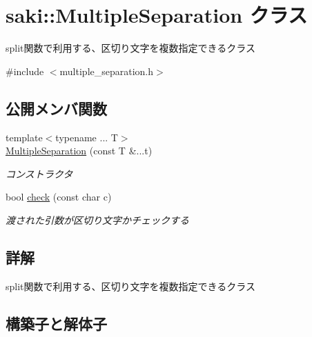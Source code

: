 \hypertarget{classsaki_1_1_multiple_separation}{}\section{saki\+:\+:Multiple\+Separation クラス}
\label{classsaki_1_1_multiple_separation}


split関数で利用する、区切り文字を複数指定できるクラス  




{\ttfamily \#include $<$multiple\+\_\+separation.\+h$>$}

\subsection*{公開メンバ関数}
\begin{DoxyCompactItemize}
\item 
{\footnotesize template$<$typename ... T$>$ }\\\mbox{\hyperlink{classsaki_1_1_multiple_separation_a5dd228278057afbf2f1779891de59c63}{Multiple\+Separation}} (const T \&...t)
\begin{DoxyCompactList}\small\item\em コンストラクタ \end{DoxyCompactList}\item 
bool \mbox{\hyperlink{classsaki_1_1_multiple_separation_a27725149daca02b021edf69c58bbe140}{check}} (const char c)
\begin{DoxyCompactList}\small\item\em 渡された引数が区切り文字かチェックする \end{DoxyCompactList}\end{DoxyCompactItemize}


\subsection{詳解}
split関数で利用する、区切り文字を複数指定できるクラス 

\subsection{構築子と解体子}
\mbox{\label{classsaki_1_1_multiple_separation_a5dd228278057afbf2f1779891de59c63}} 
